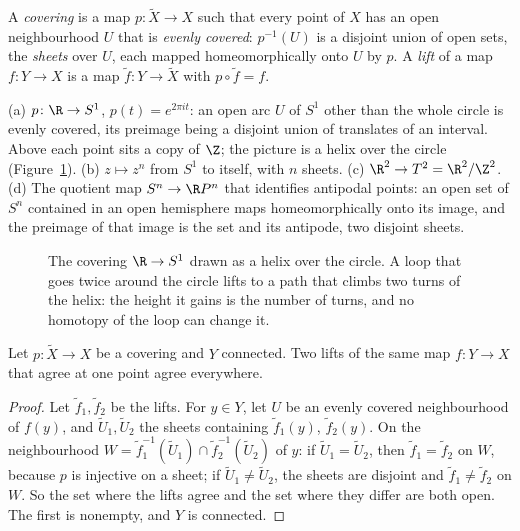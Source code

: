\begin{definition}
A \emph{covering} is a map $p\colon\tilde X\to X$ such that every point of $X$ has an open neighbourhood $U$ that is \emph{evenly covered}: $p^{-1}(U)$ is a disjoint union of open
sets, the \emph{sheets} over $U$, each mapped homeomorphically onto $U$ by $p$. A \emph{lift} of a map $f\colon Y\to X$ is a map $\tilde f\colon Y\to\tilde X$ with $p\circ\tilde f=f$.
\end{definition}

\begin{example}\label{ex:coverings}
(a) $p\colon\R\to S^1$, $p(t)=e^{2\pi it}$: an open arc $U$ of $S^1$ other than the whole circle is evenly covered, its preimage being a disjoint union of translates of an interval. Above
each point sits a copy of $\Z$; the picture is a helix over the circle (Figure~\ref{fig:helix}). (b) $z\mapsto z^n$ from $S^1$ to itself, with $n$ sheets. (c) $\R^2\to T^2=\R^2/\Z^2$.
(d) The quotient map $S^n\to\R P^n$ that identifies antipodal points: an open set of $S^n$ contained in an open hemisphere maps homeomorphically onto its image, and
the preimage of that image is the set and its antipode, two disjoint sheets.
\end{example}

\begin{figure}[ht]
\centering
{}
\caption{The covering $\R\to S^1$ drawn as a helix over the circle. A loop that goes twice around the circle lifts to a path that climbs two turns of the helix: the
height it gains is the number of turns, and no homotopy of the loop can change it.}
\label{fig:helix}
\end{figure}

\begin{lemma}\label{lem:uniquelift}
Let $p\colon\tilde X\to X$ be a covering and $Y$ connected. Two lifts of the same map $f\colon Y\to X$ that agree at one point agree everywhere.
\end{lemma}

\begin{proof}
Let $\tilde f_1,\tilde f_2$ be the lifts. For $y\in Y$, let $U$ be an evenly covered neighbourhood of $f(y)$, and $\tilde U_1,\tilde U_2$ the sheets containing $\tilde f_1(y)$, $\tilde f_2(y)$. On the
neighbourhood $W=\tilde f_1^{-1}(\tilde U_1)\cap\tilde f_2^{-1}(\tilde U_2)$ of $y$: if $\tilde U_1=\tilde U_2$, then $\tilde f_1=\tilde f_2$ on $W$, because $p$ is injective on a sheet; if $\tilde U_1\ne\tilde U_2$, the sheets are
disjoint and $\tilde f_1\ne\tilde f_2$ on $W$. So the set where the lifts agree and the set where they differ are both open. The first is nonempty, and $Y$ is connected.
\end{proof}

